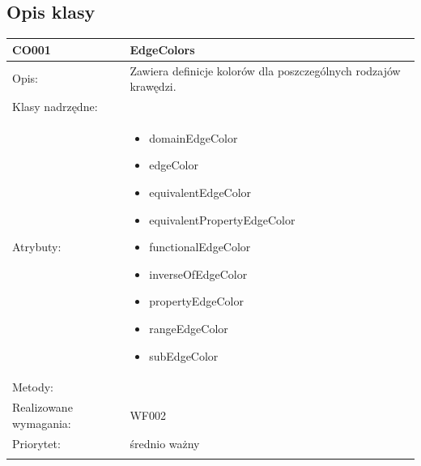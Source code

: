 \documentclass[a4paper,10pt]{article}
\begin{document}
\subsection{Opis klasy}

\begin{center}
 


\begin{longtable}{|m{3cm}|m{9cm}|} \hline

CO001 & EdgeColors \\ \hline
Opis: & Zawiera definicje kolorów dla poszczególnych rodzajów krawędzi.   \\ \hline
Klasy nadrzędne: &     \\ \hline
Atrybuty: & \begin{itemize}
 \item domainEdgeColor
 \item edgeColor
 \item equivalentEdgeColor
 \item equivalentPropertyEdgeColor
 \item functionalEdgeColor
 \item inverseOfEdgeColor
 \item propertyEdgeColor
 \item rangeEdgeColor
 \item subEdgeColor

\end{itemize}
 \\ \hline
Metody: & %
  \\ \hline
Realizowane wymagania: & WF002 \\ \hline
Priorytet: & średnio ważny \\ \hline

\multicolumn{2}{c}{} \\
 \hline


\end{longtable}
\end{center}
\end{document}

